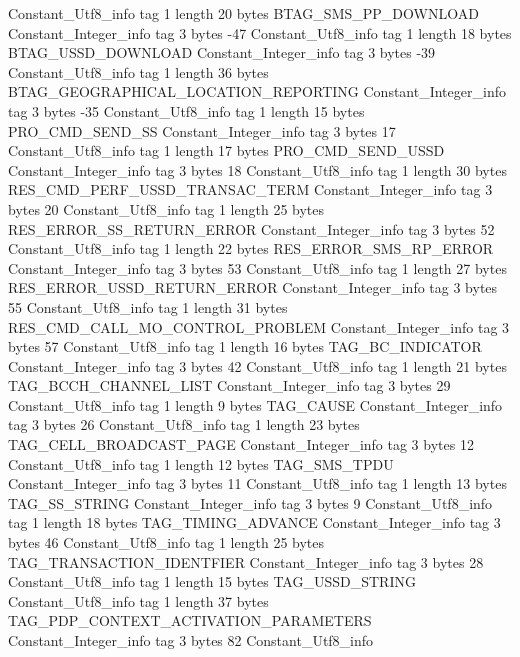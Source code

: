 {{{		}
		Constant_Utf8_info {
			tag	1
			length	20
			bytes	BTAG_SMS_PP_DOWNLOAD
		}
		Constant_Integer_info {
			tag	3
			bytes	-47
		}
		Constant_Utf8_info {
			tag	1
			length	18
			bytes	BTAG_USSD_DOWNLOAD
		}
		Constant_Integer_info {
			tag	3
			bytes	-39
		}
		Constant_Utf8_info {
			tag	1
			length	36
			bytes	BTAG_GEOGRAPHICAL_LOCATION_REPORTING
		}
		Constant_Integer_info {
			tag	3
			bytes	-35
		}
		Constant_Utf8_info {
			tag	1
			length	15
			bytes	PRO_CMD_SEND_SS
		}
		Constant_Integer_info {
			tag	3
			bytes	17
		}
		Constant_Utf8_info {
			tag	1
			length	17
			bytes	PRO_CMD_SEND_USSD
		}
		Constant_Integer_info {
			tag	3
			bytes	18
		}
		Constant_Utf8_info {
			tag	1
			length	30
			bytes	RES_CMD_PERF_USSD_TRANSAC_TERM
		}
		Constant_Integer_info {
			tag	3
			bytes	20
		}
		Constant_Utf8_info {
			tag	1
			length	25
			bytes	RES_ERROR_SS_RETURN_ERROR
		}
		Constant_Integer_info {
			tag	3
			bytes	52
		}
		Constant_Utf8_info {
			tag	1
			length	22
			bytes	RES_ERROR_SMS_RP_ERROR
		}
		Constant_Integer_info {
			tag	3
			bytes	53
		}
		Constant_Utf8_info {
			tag	1
			length	27
			bytes	RES_ERROR_USSD_RETURN_ERROR
		}
		Constant_Integer_info {
			tag	3
			bytes	55
		}
		Constant_Utf8_info {
			tag	1
			length	31
			bytes	RES_CMD_CALL_MO_CONTROL_PROBLEM
		}
		Constant_Integer_info {
			tag	3
			bytes	57
		}
		Constant_Utf8_info {
			tag	1
			length	16
			bytes	TAG_BC_INDICATOR
		}
		Constant_Integer_info {
			tag	3
			bytes	42
		}
		Constant_Utf8_info {
			tag	1
			length	21
			bytes	TAG_BCCH_CHANNEL_LIST
		}
		Constant_Integer_info {
			tag	3
			bytes	29
		}
		Constant_Utf8_info {
			tag	1
			length	9
			bytes	TAG_CAUSE
		}
		Constant_Integer_info {
			tag	3
			bytes	26
		}
		Constant_Utf8_info {
			tag	1
			length	23
			bytes	TAG_CELL_BROADCAST_PAGE
		}
		Constant_Integer_info {
			tag	3
			bytes	12
		}
		Constant_Utf8_info {
			tag	1
			length	12
			bytes	TAG_SMS_TPDU
		}
		Constant_Integer_info {
			tag	3
			bytes	11
		}
		Constant_Utf8_info {
			tag	1
			length	13
			bytes	TAG_SS_STRING
		}
		Constant_Integer_info {
			tag	3
			bytes	9
		}
		Constant_Utf8_info {
			tag	1
			length	18
			bytes	TAG_TIMING_ADVANCE
		}
		Constant_Integer_info {
			tag	3
			bytes	46
		}
		Constant_Utf8_info {
			tag	1
			length	25
			bytes	TAG_TRANSACTION_IDENTFIER
		}
		Constant_Integer_info {
			tag	3
			bytes	28
		}
		Constant_Utf8_info {
			tag	1
			length	15
			bytes	TAG_USSD_STRING
		}
		Constant_Utf8_info {
			tag	1
			length	37
			bytes	TAG_PDP_CONTEXT_ACTIVATION_PARAMETERS
		}
		Constant_Integer_info {
			tag	3
			bytes	82
		}
		Constant_Utf8_info {
}}}

